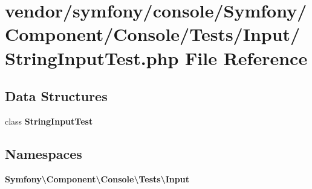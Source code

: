 \section{vendor/symfony/console/\+Symfony/\+Component/\+Console/\+Tests/\+Input/\+String\+Input\+Test.php File Reference}
\label{_string_input_test_8php}
\subsection*{Data Structures}
\begin{DoxyCompactItemize}
\item 
class {\bf String\+Input\+Test}
\end{DoxyCompactItemize}
\subsection*{Namespaces}
\begin{DoxyCompactItemize}
\item 
 {\bf Symfony\textbackslash{}\+Component\textbackslash{}\+Console\textbackslash{}\+Tests\textbackslash{}\+Input}
\end{DoxyCompactItemize}
